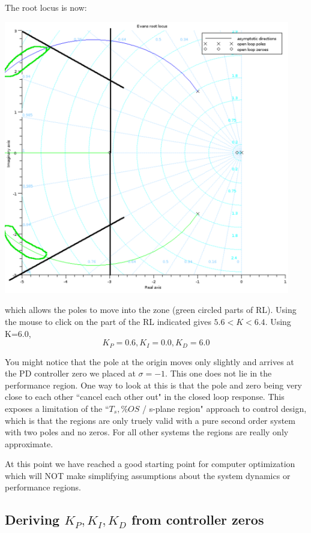\begin{ExampleCont}
The root locus is now:

\includegraphics[width=125mm]{figs11/des_examp_03aa.png}

which allows the poles to move into the zone (green circled parts of RL).   Using the mouse to click on the part of the RL indicated gives $5.6 < K < 6.4$.  Using K=6.0,
\[
K_P = 0.6, K_I = 0.0,  K_D = 6.0
\]

You might notice that the pole at the origin moves only slightly and arrives at the 
PD controller zero we placed at $\sigma=-1$.  This one does not lie in the performance 
region.  One way to look at this is that the pole and zero being very close to each other 
``cancel each other out" in the closed loop response.   
This exposes a limitation of the ``$T_s, \%OS$ / s-plane region" approach to control 
design, which is that the regions are only truely valid with a pure second order system 
with two poles and no zeros.  For all other systems the regions are really only approximate. 

At this point we have reached a good starting point for computer optimization which 
will NOT make simplifying assumptions about the system dynamics or performance regions. 
\end{ExampleCont}



\subsection{Deriving $K_P, K_I, K_D$ from controller zeros}\label{Kpderive}

